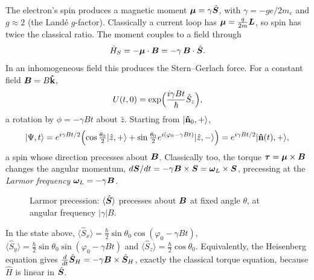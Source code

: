 
The electron's spin produces a magnetic moment $\bm{\mu} = \gamma\hat{\bm{S}}$, with $\gamma = -ge/2m_e$ and $g\approx2$ (the Land\'e $g$-factor). Classically a current loop has $\bm{\mu} = \frac{q}{2m}\vect{L}$, so spin has twice the classical ratio. The moment couples to a field through
\[
    \hat{H}_S = -\bm{\mu}\cdot\vect{B} = -\gamma\,\vect{B}\cdot\hat{\lvect{S}} .
\]
In an inhomogeneous field this produces the Stern--Gerlach force. For a constant field $\vect{B} = B\khat$,
\[
    U(t,0) = \exp\Bigl(\frac{i\gamma Bt}{\hbar}\hat{S}_z\Bigr),
\]
a rotation by $\phi = -\gamma Bt$ about $\hat{z}$. Starting from $|\boldsymbol{\hat{\textbf{n}}}_0,+\rangle$,
\[
    |\Psi,t\rangle = e^{i\gamma Bt/2}\Bigl(\cos\tfrac{\theta_0}{2}|\hat{z},+\rangle + \sin\tfrac{\theta_0}{2}e^{i(\varphi_0-\gamma Bt)}|\hat{z},-\rangle\Bigr) = e^{i\gamma Bt/2}|\boldsymbol{\hat{\textbf{n}}}(t),+\rangle,
\]
a spin whose direction precesses about $\vect{B}$. Classically too, the torque $\bm{\tau} = \bm{\mu}\times\vect{B}$ changes the angular momentum, $d\lvect{S}/dt = -\gamma\vect{B}\times\lvect{S} = \bm{\omega}_L\times\lvect{S}$, precessing at the \emph{Larmor frequency} $\bm{\omega}_L = -\gamma\vect{B}$.

\begin{figure}[ht]
\centering
{}
\caption{Larmor precession: $\langle\hat{\bm{S}}\rangle$ precesses about $\vect{B}$ at fixed angle $\theta$, at angular frequency $|\gamma|B$.}
\end{figure}

\begin{example}
In the state above, $\langle\hat{S}_x\rangle = \frac\hbar2\sin\theta_0\cos(\varphi_0-\gamma Bt)$, $\langle\hat{S}_y\rangle = \frac\hbar2\sin\theta_0\sin(\varphi_0-\gamma Bt)$ and $\langle\hat{S}_z\rangle = \frac\hbar2\cos\theta_0$. Equivalently, the Heisenberg equation gives $\frac{d}{dt}\hat{\lvect{S}}_H = -\gamma\vect{B}\times\hat{\lvect{S}}_H$, exactly the classical torque equation, because $\hat{H}$ is linear in $\hat{\bm{S}}$.
\end{example}

